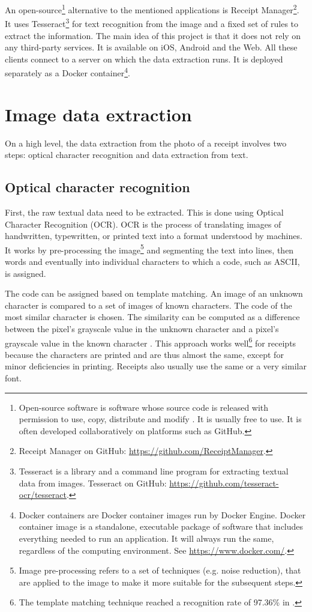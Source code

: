 \documentclass[
  digital, %
  table,   %
  oneside, %
  lof,     %
  lot,     %
]{fithesis3}
\begin{document}
An open-source\footnote{Open-source software is software whose source code is released with permission to use, copy, distribute and modify \cite{GartnerOpenSource}. It is usually free to use. It is often developed collaboratively on platforms such as GitHub.} alternative to the mentioned applications is Receipt Manager\footnote{Receipt Manager on GitHub: \url{https://github.com/ReceiptManager}.}.
It uses Tesseract\footnote{Tesseract is a library and a command line program for extracting textual data from images. Tesseract on GitHub: \url{https://github.com/tesseract-ocr/tesseract}.} for text recognition from the image and a fixed set of rules to extract the information. The main idea of this project is that it does not rely on any third-party services.
It is available on iOS, Android and the Web. All these clients connect to a server on which the data extraction runs. It is deployed separately as a Docker container\footnote{Docker containers are Docker container images run by Docker Engine. Docker container image is a standalone, executable package of software that includes everything needed to run an application. It will always run the same, regardless of the computing environment. \cite{DockerContainer} See \url{https://www.docker.com/}.}.

\chapter{Image data extraction}
On a high level, the data extraction from the photo of a receipt involves two steps: optical character recognition and data extraction from text.

\section{Optical character recognition}
First, the raw textual data need to be extracted. This is done using Optical Character Recognition (OCR). OCR is the process of translating images of handwritten, typewritten, or printed text into a format understood by machines.
It works by pre-processing the image\footnote{Image pre-processing refers to a set of techniques (e.g. noise reduction), that are applied to the image to make it more suitable for the subsequent steps.} and segmenting the text into lines, then words and eventually into individual characters to which a code, such as ASCII, is assigned. \cite{Shreya2019OCRCNN}

The code can be assigned based on template matching. An image of an unknown character is compared to a set of images of known characters. The code of the most similar character is chosen. The similarity can be computed as a difference between the pixel's grayscale value in the unknown character and a pixel's grayscale value in the known character \cite{Ziegaus2016TemplateMatching}.
This approach works well\footnote{The template matching technique reached a recognition rate of 97.36\% in \cite{Ziegaus2016TemplateMatching}.} for receipts because the characters are printed and are thus almost the same, except for minor deficiencies in printing. Receipts also usually use the same or a very similar font.
\end{document}
